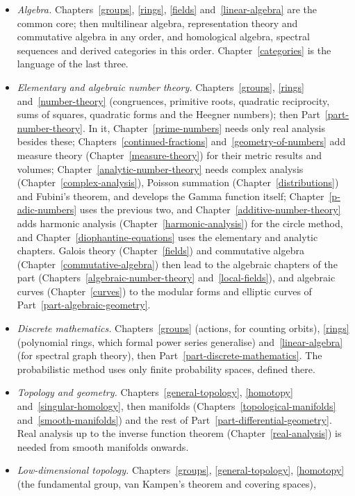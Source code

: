 \begin{itemize}
\item \emph{Algebra.} Chapters~\ref{groups}, \ref{rings}, \ref{fields} and~\ref{linear-algebra} are the common core; then multilinear algebra, representation theory and
commutative algebra in any order, and homological algebra, spectral sequences and derived categories in this order. Chapter~\ref{categories} is the language of the last three.
\item \emph{Elementary and algebraic number theory.} Chapters~\ref{groups}, \ref{rings} and~\ref{number-theory} (congruences, primitive roots, quadratic reciprocity, sums of
squares, quadratic forms and the Heegner numbers); then Part~\ref{part-number-theory}. In it, Chapter~\ref{prime-numbers} needs only real analysis besides these;
Chapters~\ref{continued-fractions} and~\ref{geometry-of-numbers} add measure theory (Chapter~\ref{measure-theory}) for their metric results and volumes;
Chapter~\ref{analytic-number-theory} needs complex analysis (Chapter~\ref{complex-analysis}), Poisson summation (Chapter~\ref{distributions}) and Fubini's theorem, and develops the
Gamma function itself; Chapter~\ref{p-adic-numbers} uses the previous two, and
Chapter~\ref{additive-number-theory} adds harmonic analysis (Chapter~\ref{harmonic-analysis}) for the circle method, and
Chapter~\ref{diophantine-equations} uses the elementary and analytic chapters. Galois theory (Chapter~\ref{fields}) and commutative algebra (Chapter~\ref{commutative-algebra}) then lead to
the algebraic chapters of the part (Chapters~\ref{algebraic-number-theory} and~\ref{local-fields}), and algebraic curves (Chapter~\ref{curves}) to the modular forms and elliptic curves of
Part~\ref{part-algebraic-geometry}.
\item \emph{Discrete mathematics.} Chapters~\ref{groups} (actions, for counting orbits), \ref{rings} (polynomial rings, which formal power series generalise)
and~\ref{linear-algebra} (for spectral graph theory), then Part~\ref{part-discrete-mathematics}. The probabilistic method uses only finite probability spaces, defined there.
\item \emph{Topology and geometry.} Chapters~\ref{general-topology}, \ref{homotopy} and~\ref{singular-homology}, then manifolds
(Chapters~\ref{topological-manifolds} and~\ref{smooth-manifolds}) and the rest of Part~\ref{part-differential-geometry}. Real analysis up to the inverse function theorem
(Chapter~\ref{real-analysis}) is needed from smooth manifolds onwards.
\item \emph{Low-dimensional topology.} Chapters~\ref{groups}, \ref{general-topology}, \ref{homotopy} (the fundamental group, van Kampen's theorem and covering spaces),

\end{itemize}
